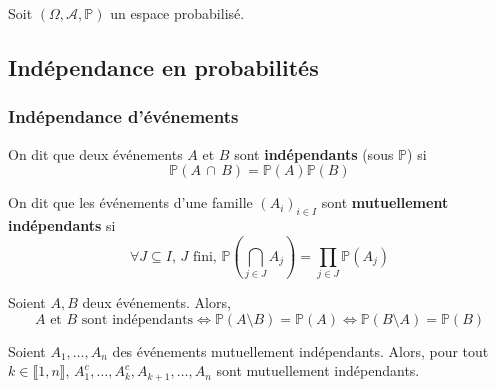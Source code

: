 




  Soit $(\Omega, \mathcal{A}, \mathbb{P})$ un espace probabilisé.

  \subsection{Indépendance en probabilités}

  \subsubsection{Indépendance d'événements}


  \begin{definition}
    On dit que deux événements $A$ et $B$ sont \textbf{indépendants} (sous $\mathbb{P}$) si
    \[ \mathbb{P}(A \, \cap \, B) = \mathbb{P}(A) \mathbb{P}(B) \]
  \end{definition}

  \begin{definition}
    On dit que les événements d'une famille $(A_i)_{i \in I}$ sont \textbf{mutuellement indépendants} si
    \[ \forall J \subseteq I, \, J \text{ fini}, \, \mathbb{P}\left( \bigcap_{j \in J} A_j \right) = \prod_{j \in J} \mathbb{P}(A_j) \]
  \end{definition}


  \begin{proposition}
    Soient $A, B$ deux événements. Alors,
    \[ A \text{ et } B \text{ sont indépendants} \iff \mathbb{P}(A \setminus B) = \mathbb{P}(A) \iff \mathbb{P}(B \setminus A) = \mathbb{P}(B) \]
  \end{proposition}

  \begin{proposition}
    Soient $A_1, \dots, A_n$ des événements mutuellement indépendants. Alors, pour tout $k \in \llbracket 1, n \rrbracket$, $A_1^c, \dots, A_k^c, A_{k+1}, \dots, A_n$ sont mutuellement indépendants.
  \end{proposition}

